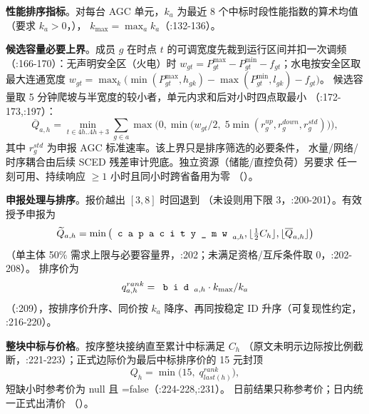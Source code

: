 \textbf{性能排序指标}。对每台 AGC 单元，$k_a$ 为最近 8 个中标时段性能指数的算术均值
（要求 $k_a>0$，），
$k_{\max}=\max_a k_a$（:132-136）。

\textbf{候选容量必要上界}。成员 $g$ 在时点 $t$ 的可调宽度先裁到运行区间并扣一次调频
（:166-170）：无声明安全区（火电）时
$w_{gt}=P^{\max}_{gt}-P^{\min}_{gt}-f_{gt}$；水电按安全区取最大连通宽度
$w_{gt}=\max_k\big(\min(P^{\max}_{gt},h_{gk})-\max(P^{\min}_{gt},l_{gk})-f_{gt}\big)$。
候选容量取 5 分钟爬坡与半宽度的较小者，单元内求和后对小时四点取最小
（:172-173,:197）：
\begin{equation}
 \overline Q_{a,h}=\min_{t\in 4h..4h+3}\sum_{g\in a}
 \max\!\Big(0,\min\big(w_{gt}/2,\;5\min(r^{up}_g,r^{down}_g,r^{std}_g)\big)\Big),
\end{equation}
其中 $r^{std}_g$ 为申报 AGC 标准速率。该上界只是排序筛选的必要条件，
水量/网络/时序耦合由后续 SCED 残差审计兜底。独立资源（储能/直控负荷）另要求
任一刻可用、持续响应 $\ge1$ 小时且同小时跨省备用为零
（）。

\textbf{申报处理与排序}。报价越出 $[3,8]$ 时回退到 
（未设则用下限 3，:200-201）。有效授予申报为
\begin{equation}
 \widetilde Q_{a,h}=\min\big(\fld{capacity\_mw}_{a,h},\lfloor \tfrac12 C_h\rfloor,
 \lfloor \overline Q_{a,h}\rfloor\big)
\end{equation}
（单主体 50\% 需求上限与必要容量界，:202；未满足资格/互斥条件取 0，:202-208）。
排序价为
\begin{equation}
 q^{rank}_{a,h}=\fld{bid}_{a,h}\cdot k_{\max}/k_a
\end{equation}
（:209），按排序价升序、同价按 $k_a$ 降序、再同按稳定 ID 升序（可复现性约定，
:216-220）。

\textbf{整块中标与价格}。按序整块接纳直至累计中标满足 $C_h$
（原文未明示边际按比例截断，:221-223）；正式边际价为最后中标排序价的 15 元封顶
\begin{equation}
 Q_h=\min\!\big(15,\;q^{rank}_{last(h)}\big),
\end{equation}
短缺小时参考价为 null 且 =false（:224-228,:231）。
日前结果只称参考价；日内统一正式出清价 
（）。

